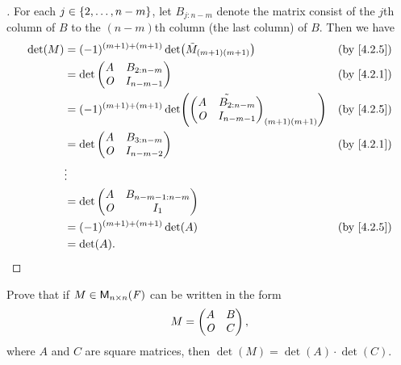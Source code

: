 \begin{proof}[]
	For each \(j \in \left\lbrace2, \dots, n - m\right\rbrace\), let \(B_{j : n - m}\) denote the matrix consist of the \(j\)th column of \(B\) to the \((n - m)\)th column (the last column) of \(B\).
	Then we have
	\begin{align*}
		\det(M) & = (-1)^{(m + 1) + (m + 1)} \det\pa{\tilde{M}_{(m + 1) (m + 1)}} &  & \by{4.2.5}                   \\
		        & = \det\begin{pmatrix}
			                A   & B_{2 : n - m} \\
			                \zm & I_{n - m - 1}
		                \end{pmatrix}                                          &  & \by{4.2.1}                      \\
		        & = (-1)^{(m + 1) + (m + 1)} \det\pa{\tilde{\begin{pmatrix}
					                                                    A   & B_{2 : n - m} \\
					                                                    \zm & I_{n - m - 1}
				                                                    \end{pmatrix}}_{(m + 1) (m + 1)}}       &  & \by{4.2.5} \\
		        & = \det\begin{pmatrix}
			                A   & B_{3 : n - m} \\
			                \zm & I_{n - m - 2}
		                \end{pmatrix}                                          &  & \by{4.2.1}                      \\
		        & \vdots                                                                                            \\
		        & = \det\begin{pmatrix}
			                A   & B_{n - m - 1 : n - m} \\
			                \zm & I_1
		                \end{pmatrix}                                                                 \\
		        & = (-1)^{(m + 1) + (m + 1)} \det(A)                              &  & \by{4.2.5}                   \\
		        & = \det(A).
	\end{align*}
\end{proof}

\begin{ex}\label{ex:4.3.21}
	Prove that if \(M \in \ms[n][n][\F]\) can be written in the form
	\[
		M = \begin{pmatrix}
			A   & B \\
			\mathit{O} & C
		\end{pmatrix},
	\]
	where \(A\) and \(C\) are square matrices, then \(\det(M) = \det(A) \cdot \det(C)\).
\end{ex}

